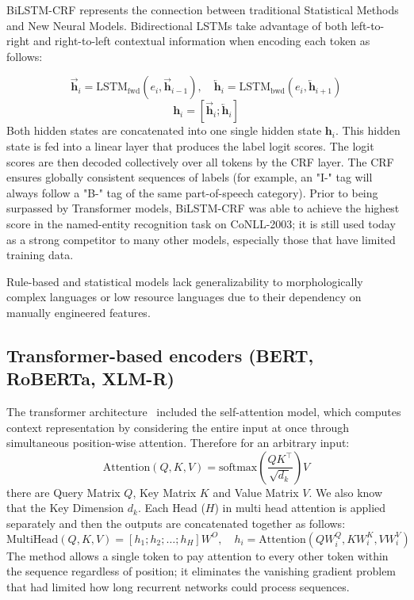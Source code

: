 BiLSTM-CRF represents the connection between traditional Statistical Methods and New Neural Models. Bidirectional LSTMs take advantage of both left-to-right and right-to-left contextual information when encoding each token as follows:

\begin{equation}
  \overrightarrow{\mathbf{h}}_i = \text{LSTM}_\text{fwd}(e_i, \overrightarrow{\mathbf{h}}_{i-1}), \quad
  \overleftarrow{\mathbf{h}}_i = \text{LSTM}_\text{bwd}(e_i, \overleftarrow{\mathbf{h}}_{i+1})
\end{equation}
\begin{equation}
  \mathbf{h}_i = [\overrightarrow{\mathbf{h}}_i; \overleftarrow{\mathbf{h}}_i]
\end{equation}
Both hidden states are concatenated into one single 
hidden state $\mathbf{h}_i$. This hidden state is fed into a linear layer that produces the label logit scores. The logit scores are then decoded collectively over all tokens by the CRF layer. The CRF ensures globally consistent sequences of labels (for example, an "I-" tag will always follow a "B-" tag of the same part-of-speech category).
Prior to being surpassed by Transformer models, BiLSTM-CRF was able to achieve the highest score in the named-entity recognition task on CoNLL-2003; it is still used today as a strong competitor to many other models, especially those that have limited training data.

Rule-based and statistical models lack generalizability to morphologically complex languages or low resource languages due to their dependency on manually engineered features.


\subsection{Transformer-based encoders (BERT, RoBERTa, XLM-R)}
\label{sec:transformers}

The transformer architecture~\cite{vaswani2017attention} included the self-attention model, which computes context representation by considering the entire input at once through simultaneous position-wise attention. Therefore for an arbitrary input:
\begin{equation}
  \text{Attention}(Q, K, V) = \text{softmax}\!\left(\frac{QK^\top}{\sqrt{d_k}}\right) V
  \label{eq:attention}
\end{equation}
there are Query Matrix $Q$, Key Matrix $K$ and Value Matrix $V$. We also know that the Key Dimension $d_k$. Each Head ($H$) in multi head attention is applied separately and then the outputs are concatenated together as follows: 
\begin{equation}
  \text{MultiHead}(Q, K, V) = [h_1; h_2; \ldots; h_H] W^O, \quad h_i = \text{Attention}(QW_i^Q, KW_i^K, VW_i^V)
\end{equation}
The method allows a single token to pay attention to every other token within the sequence regardless of position; it eliminates the vanishing gradient problem that had limited how long recurrent networks could process sequences.


